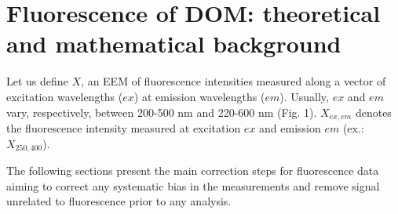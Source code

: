 \documentclass[]{book}
\theoremstyle{definition}
\theoremstyle{definition}
\theoremstyle{remark}
\begin{document}
\section{Fluorescence of DOM: theoretical and mathematical
background}\label{fluorescence-of-dom-theoretical-and-mathematical-background}

Let us define \(X\), an EEM of fluorescence intensities measured along a
vector of excitation wavelengths (\(ex\)) at emission wavelengths
(\(em\)). Usually, \(ex\) and \(em\) vary, respectively, between 200-500
nm and 220-600 nm (Fig. 1). \(X_{ex, em}\) denotes the fluorescence
intensity measured at excitation \(ex\) and emission \(em\) (ex.:
\(X_{250, 400}\)).

The following sections present the main correction steps for
fluorescence data aiming to correct any systematic bias in the
measurements and remove signal unrelated to fluorescence prior to any
analysis.
\end{document}
